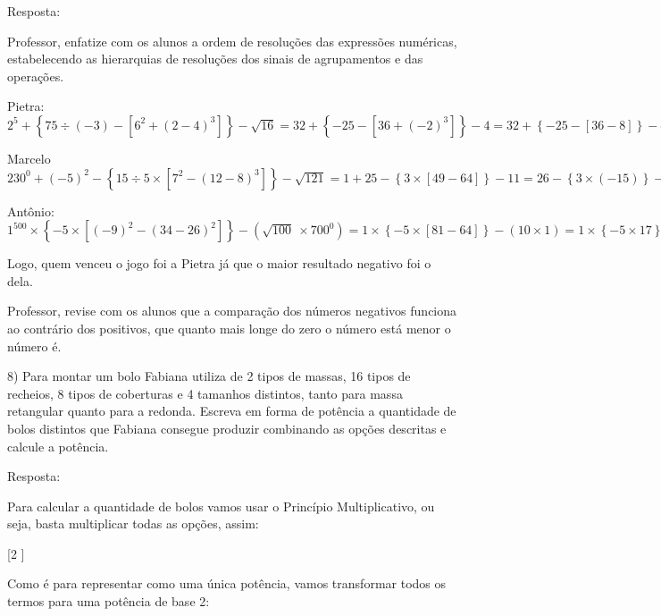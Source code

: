 Resposta:

Professor, enfatize com os alunos a ordem de resoluções das expressões
numéricas, estabelecendo as hierarquias de resoluções dos sinais de
agrupamentos e das operações.

Pietra:\\
\(2^{5} + \left\{ 75 \div \left( - 3 \right) - \left\lbrack 6^{2} + \left( 2 - 4 \right)^{3} \right\rbrack \right\} - \sqrt{16} = 32 + \left\{ - 25 - \left\lbrack 36 + \left( - 2 \right)^{3} \right\rbrack \right\} - 4 = 32 + \left\{ - 25 - \left\lbrack 36 - 8 \right\rbrack \right\} - 4 = 32 + \left\{ - 25 - 28 \right\} - 4 = 32 - 53 - 4 = - 25\)

Marcelo\\
\(230^{0} + \left( - 5 \right)^{2} - \left\{ 15 \div 5 \times \left\lbrack 7^{2} - \left( 12 - 8 \right)^{3} \right\rbrack \right\} - \sqrt{121} = 1 + 25 - \left\{ 3 \times \left\lbrack 49 - 64 \right\rbrack \right\} - 11 = 26 - \left\{ 3 \times \left( - 15 \right) \right\} - 11 = 26 - \left\{ - 45 \right\} - 11 = 26 + 45 - 11 = 60\)

Antônio:
\(1^{500} \times \left\{ - 5 \times \left\lbrack \left( - 9 \right)^{2} - \left( 34 - 26 \right)^{2} \right\rbrack \right\} - \left( \sqrt{100}\  \times 700^{0} \right) = 1 \times \left\{ - 5 \times \left\lbrack 81 - 64 \right\rbrack \right\} - \left( 10 \times 1 \right) = 1 \times \left\{ - 5 \times 17 \right\} - 10 = 1 \times \left( - 85 \right) - 10 = - 85 - 10 = - 95\)

Logo, quem venceu o jogo foi a Pietra já que o maior resultado negativo
foi o dela.

Professor, revise com os alunos que a comparação dos números negativos
funciona ao contrário dos positivos, que quanto mais longe do zero o
número está menor o número é.

8) Para montar um bolo Fabiana utiliza de 2 tipos de massas, 16 tipos de
recheios, 8 tipos de coberturas e 4 tamanhos distintos, tanto para massa
retangular quanto para a redonda. Escreva em forma de potência a
quantidade de bolos distintos que Fabiana consegue produzir combinando
as opções descritas e calcule a potência.

Resposta:

Para calcular a quantidade de bolos vamos usar o Princípio
Multiplicativo, ou seja, basta multiplicar todas as opções, assim:

[2    ]

Como é para representar como uma única potência, vamos transformar todos
os termos para uma potência de base 2:

